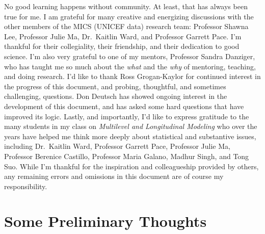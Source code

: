 \documentclass[
  letterpaper,
  DIV=11,
  numbers=noendperiod]{scrreprt}
\begin{document}
No good learning happens without community. At least, that has always
been true for me. I am grateful for many creative and energizing
discussions with the other members of the MICS (UNICEF data) research
team: Professor Shawna Lee, Professor Julie Ma, Dr.~Kaitlin Ward, and
Professor Garrett Pace. I'm thankful for their collegiality, their
friendship, and their dedication to good science. I'm also very grateful
to one of my mentors, Professor Sandra Danziger, who has taught me so
much about the \emph{what} and the \emph{why} of mentoring, teaching,
and doing research. I'd like to thank Ross Grogan-Kaylor for continued
interest in the progress of this document, and probing, thoughtful, and
sometimes challenging, questions. Don Deutsch has showed ongoing
interest in the development of this document, and has asked some hard
questions that have improved its logic. Lastly, and importantly, I'd
like to express gratitude to the many students in my class on
\emph{Multilevel and Longitudinal Modeling} who over the years have
helped me think more deeply about statistical and substantive issues,
including Dr.~Kaitlin Ward, Professor Garrett Pace, Professor Julie Ma,
Professor Berenice Castillo, Professor Maria Galano, Madhur Singh, and
Tong Suo. While I'm thankful for the inspiration and colleagueship
provided by others, any remaining errors and omissions in this document
are of course my responsibility.


\hypertarget{some-preliminary-thoughts}{%
\chapter*{Some Preliminary Thoughts}\label{some-preliminary-thoughts}}
\end{document}
